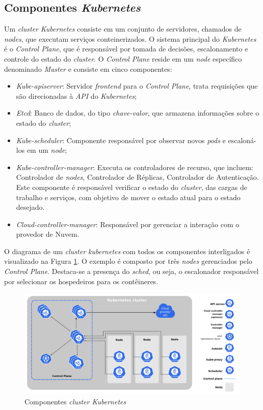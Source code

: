 \subsection{Componentes \textit{Kubernetes}}
Um \textit{cluster} \textit{Kubernetes} consiste em um conjunto de servidores, chamados de \textit{nodes}, que executam serviços conteinerizados. O sistema principal do \textit{Kubernetes} é o \textit{Control Plane}, que é responsável por tomada de decisões, escalonamento e controle do estado do \textit{cluster}. O \textit{Control Plane} reside em um \textit{node} específico denominado \textit{Master} e consiste em cinco componentes:

\begin{itemize}
    \item \textit{Kube-apiserver}: Servidor \textit{frontend} para o \textit{Control Plane}, trata requisições que são direcionadas à \textit{API} do \textit{Kubernetes};
    \item \textit{Etcd}: Banco de dados, do tipo \textit{chave-valor}, que armazena informações sobre o estado do \textit{cluster};
    \item \textit{Kube-scheduler}: Componente responsável por observar novos \textit{pods} e escaloná-los em um \textit{node};
    \item \textit{Kube-controller-manager}: Executa os controladores de recurso, que incluem: Controlador de \textit{nodes}, Controlador de Réplicas, Controlador de Autenticação. Este componente é responsável verificar o estado do \textit{cluster}, das cargas de trabalho e serviços, com objetivo de mover o estado atual para o estado desejado.
    \item \textit{Cloud-controller-manager}: Responsável por gerenciar a interação com o provedor de Nuvem.
\end{itemize}

O diagrama de um \textit{cluster kubernetes} com todos os componentes interligados é visualizado na Figura \ref{fig:components_of_kubernetes}.
%
O exemplo é composto por três \textit{nodes} gerenciados pelo \textit{Control Plane}.
%
Destaca-se a presença do \textit{sched}, ou seja, o escalonador responsável por selecionar os hospedeiros para os contêineres.

\begin{figure}[h!]
	\caption{\label{fig:components_of_kubernetes}Componentes \textit{cluster Kubernetes}}
	\centering
	\includegraphics[width=.84\linewidth]{assets/components-of-kubernetes.pdf}
\end{figure}

